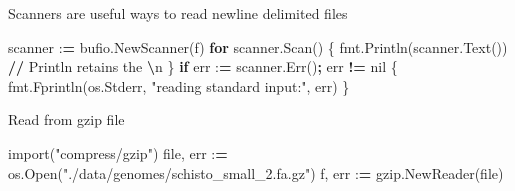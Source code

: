 \documentclass[]{book}
\newenvironment{Shaded}{\begin{snugshade}}{\end{snugshade}}
\newcommand{\StringTok}[1]{\textcolor[rgb]{0.31,0.60,0.02}{#1}}
\newcommand{\ImportTok}[1]{#1}
\newcommand{\ControlFlowTok}[1]{\textcolor[rgb]{0.13,0.29,0.53}{\textbf{#1}}}
\newcommand{\OperatorTok}[1]{\textcolor[rgb]{0.81,0.36,0.00}{\textbf{#1}}}
\newcommand{\BuiltInTok}[1]{#1}
\newcommand{\NormalTok}[1]{#1}
\begin{document}
Scanners are useful ways to read newline delimited files

\begin{Shaded}
\begin{Highlighting}[]
\NormalTok{scanner :}\OperatorTok{=}\NormalTok{ bufio.NewScanner(f)                             }
\ControlFlowTok{for}\NormalTok{ scanner.Scan() \{                                       }
\NormalTok{    fmt.Println(scanner.Text()) }\OperatorTok{//}\NormalTok{ Println retains the }\OperatorTok{\textbackslash{}}\NormalTok{n  }
\NormalTok{\}                                                          }
\ControlFlowTok{if}\NormalTok{ err :}\OperatorTok{=}\NormalTok{ scanner.Err()}\OperatorTok{;}\NormalTok{ err }\OperatorTok{!=}\NormalTok{ nil \{                      }
\NormalTok{    fmt.Fprintln(os.Stderr, }\StringTok{"reading standard input:"}\NormalTok{, err)}
\NormalTok{\}}
\end{Highlighting}
\end{Shaded}

Read from gzip file

\begin{Shaded}
\begin{Highlighting}[]
\ImportTok{import}\NormalTok{(}\StringTok{"compress/gzip"}\NormalTok{)                                                          }
\BuiltInTok{file}\NormalTok{, err :}\OperatorTok{=}\NormalTok{ os.Open(}\StringTok{"./data/genomes/schisto_small_2.fa.gz"}\NormalTok{)}
\NormalTok{f, err :}\OperatorTok{=}\NormalTok{ gzip.NewReader(}\BuiltInTok{file}\NormalTok{)}
\end{Highlighting}
\end{Shaded}


\end{document}
